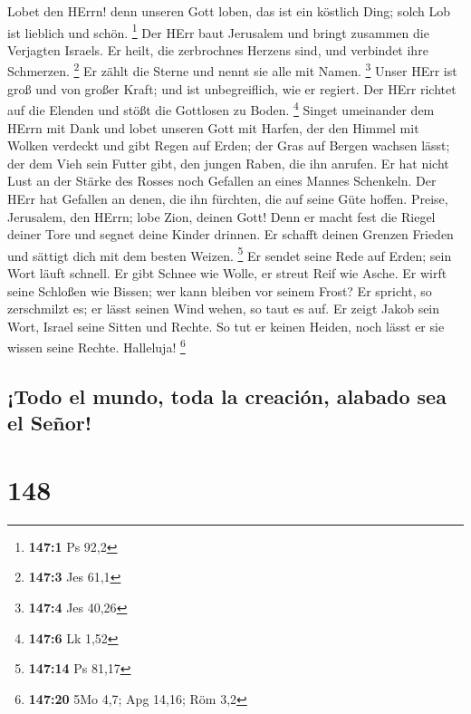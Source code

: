  Lobet den HErrn! denn unseren Gott loben, das ist ein
köstlich Ding; solch Lob ist lieblich und schön. \footnote{\textbf{147:1}
  Ps 92,2}  Der HErr baut Jerusalem und bringt zusammen
die Verjagten Israels.  Er heilt, die zerbrochnes Herzens
sind, und verbindet ihre Schmerzen. \footnote{\textbf{147:3} Jes 61,1}
 Er zählt die Sterne und nennt sie alle mit Namen.
\footnote{\textbf{147:4} Jes 40,26}  Unser HErr ist groß
und von großer Kraft; und ist unbegreiflich, wie er regiert.
 Der HErr richtet auf die Elenden und stößt die Gottlosen
zu Boden. \footnote{\textbf{147:6} Lk 1,52}  Singet
umeinander dem HErrn mit Dank und lobet unseren Gott mit Harfen,
 der den Himmel mit Wolken verdeckt und gibt Regen auf
Erden; der Gras auf Bergen wachsen lässt;  der dem Vieh
sein Futter gibt, den jungen Raben, die ihn anrufen.  Er
hat nicht Lust an der Stärke des Rosses noch Gefallen an eines Mannes
Schenkeln.  Der HErr hat Gefallen an denen, die ihn
fürchten, die auf seine Güte hoffen.  Preise, Jerusalem,
den HErrn; lobe Zion, deinen Gott!  Denn er macht fest
die Riegel deiner Tore und segnet deine Kinder drinnen. 
Er schafft deinen Grenzen Frieden und sättigt dich mit dem besten
Weizen. \footnote{\textbf{147:14} Ps 81,17}  Er sendet
seine Rede auf Erden; sein Wort läuft schnell.  Er gibt
Schnee wie Wolle, er streut Reif wie Asche.  Er wirft
seine Schloßen wie Bissen; wer kann bleiben vor seinem Frost?
 Er spricht, so zerschmilzt es; er lässt seinen Wind
wehen, so taut es auf.  Er zeigt Jakob sein Wort, Israel
seine Sitten und Rechte.  So tut er keinen Heiden, noch
lässt er sie wissen seine Rechte. Halleluja! \footnote{\textbf{147:20}
  5Mo 4,7; Apg 14,16; Röm 3,2}

\hypertarget{todo-el-mundo-toda-la-creaciuxf3n-alabado-sea-el-seuxf1or}{%
\subsection{¡Todo el mundo, toda la creación, alabado sea el
Señor!}\label{todo-el-mundo-toda-la-creaciuxf3n-alabado-sea-el-seuxf1or}}

\hypertarget{section-147}{%
\section{148}\label{section-147}}


